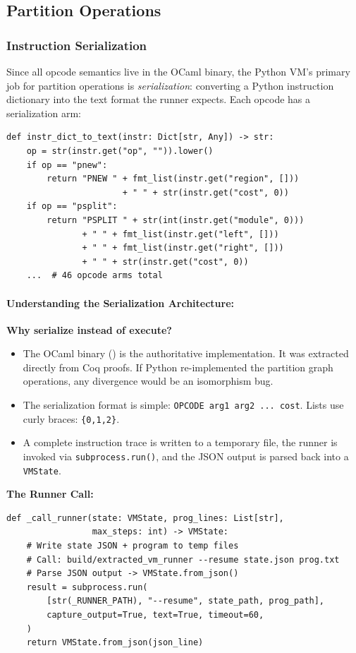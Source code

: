 \subsection{Partition Operations}

\subsubsection{Instruction Serialization}

Since all opcode semantics live in the OCaml binary, the Python VM's primary job for partition operations is \emph{serialization}: converting a Python instruction dictionary into the text format the runner expects. Each opcode has a serialization arm:
\begin{lstlisting}
def instr_dict_to_text(instr: Dict[str, Any]) -> str:
    op = str(instr.get("op", "")).lower()
    if op == "pnew":
        return "PNEW " + fmt_list(instr.get("region", []))
                       + " " + str(instr.get("cost", 0))
    if op == "psplit":
        return "PSPLIT " + str(int(instr.get("module", 0)))
               + " " + fmt_list(instr.get("left", []))
               + " " + fmt_list(instr.get("right", []))
               + " " + str(instr.get("cost", 0))
    ...  # 46 opcode arms total
\end{lstlisting}

\paragraph{Understanding the Serialization Architecture:}
\textbf{Why serialize instead of execute?}
\begin{itemize}
    \item The OCaml binary () is the authoritative implementation. It was extracted directly from Coq proofs. If Python re-implemented the partition graph operations, any divergence would be an isomorphism bug.
    \item The serialization format is simple: \texttt{OPCODE arg1 arg2 ... cost}. Lists use curly braces: \texttt{\{0,1,2\}}.
    \item A complete instruction trace is written to a temporary file, the runner is invoked via \texttt{subprocess.run()}, and the JSON output is parsed back into a \texttt{VMState}.
\end{itemize}

\textbf{The Runner Call:}
\begin{lstlisting}
def _call_runner(state: VMState, prog_lines: List[str],
                 max_steps: int) -> VMState:
    # Write state JSON + program to temp files
    # Call: build/extracted_vm_runner --resume state.json prog.txt
    # Parse JSON output -> VMState.from_json()
    result = subprocess.run(
        [str(_RUNNER_PATH), "--resume", state_path, prog_path],
        capture_output=True, text=True, timeout=60,
    )
    return VMState.from_json(json_line)
\end{lstlisting}

